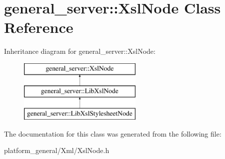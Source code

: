 \hypertarget{classgeneral__server_1_1XslNode}{\section{general\-\_\-server\-:\-:\-Xsl\-Node \-Class \-Reference}
\label{classgeneral__server_1_1XslNode}
}
\-Inheritance diagram for general\-\_\-server\-:\-:\-Xsl\-Node\-:\begin{figure}[H]
\begin{center}
\leavevmode
\includegraphics[height=3.000000cm]{classgeneral__server_1_1XslNode}
\end{center}
\end{figure}


\-The documentation for this class was generated from the following file\-:\begin{DoxyCompactItemize}
\item 
platform\-\_\-general/\-Xml/\-Xsl\-Node.\-h\end{DoxyCompactItemize}
